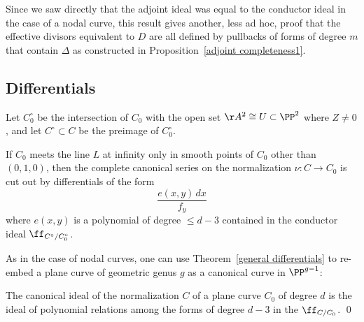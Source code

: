 Since we saw directly that the adjoint ideal was equal to the conductor
ideal in the case of
a nodal curve, this result gives another, less ad hoc, proof that the
effective divisors equivalent to $D$
are all defined by
pullbacks of forms of degree $m$ that contain $\Delta$
as constructed in Proposition~\ref{adjoint completeness1}.

\subsection*{Differentials}

Let $C^\circ_0$ be the intersection of $C_0$ with the open set
$\AA^{2}\cong U\subset \PP^{2}$ where $Z \neq 0$,
and let $C^\circ \subset C$ be the preimage of $C^\circ_0$.

\begin{theorem}\label{general differentials}
If $C_{0}$ meets the line $L$ at infinity only in smooth points of
$C_{0}$ other than $(0,1,0)$, then the complete canonical series on the
normalization $\nu: C \to C_{0}$ is cut out by differentials of the form
$$
 \frac{e(x,y)\,dx}{f_{y}}
$$
where $e(x,y)$ is a polynomial of degree $\leq d-3$ contained in the
conductor ideal $\ff_{C^{\circ}/C_{0}^{\circ}}$.
\unif
\end{theorem}

As in the case of nodal curves, one can use
Theorem~\ref{general differentials} to re-embed a plane curve of
geometric genus $g$ as a canonical curve in $\PP^{g-1}$:

\begin{corollary}
 The canonical ideal of the normalization $C$ of a plane curve $C_{0}$
%
%
%
 of degree $d$
 is the ideal of polynomial relations
 among the forms of degree $d-3$ in the 
 $\ff_{C/C_{0}}$. \qed
\end{corollary}

